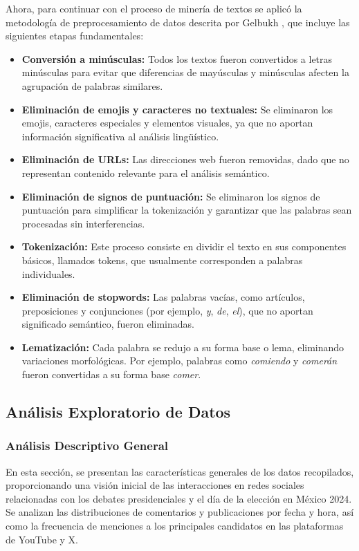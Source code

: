 \documentclass[10pt, a4paper]{article}
\begin{document}
	Ahora, para continuar con el proceso de minería de textos se aplicó la metodología de preprocesamiento de datos descrita por Gelbukh \parencite{gelbukh2003procesamiento}, que incluye las siguientes etapas fundamentales:
	
	\begin{itemize}
		\item \textbf{Conversión a minúsculas:} Todos los textos fueron convertidos a letras minúsculas para evitar que diferencias de mayúsculas y minúsculas afecten la agrupación de palabras similares.
		
		\item \textbf{Eliminación de emojis y caracteres no textuales:} Se eliminaron los emojis, caracteres especiales y elementos visuales, ya que no aportan información significativa al análisis lingüístico.
		
		\item \textbf{Eliminación de URLs:} Las direcciones web fueron removidas, dado que no representan contenido relevante para el análisis semántico.
		
		\item \textbf{Eliminación de signos de puntuación:} Se eliminaron los signos de puntuación para simplificar la tokenización y garantizar que las palabras sean procesadas sin interferencias.
		
		\item \textbf{Tokenización:} Este proceso consiste en dividir el texto en sus componentes básicos, llamados tokens, que usualmente corresponden a palabras individuales.
		
		\item \textbf{Eliminación de stopwords:} Las palabras vacías, como artículos, preposiciones y conjunciones (por ejemplo, \textit{y}, \textit{de}, \textit{el}), que no aportan significado semántico, fueron eliminadas.
		
		\item \textbf{Lematización:} Cada palabra se redujo a su forma base o lema, eliminando variaciones morfológicas. Por ejemplo, palabras como \textit{comiendo} y \textit{comerán} fueron convertidas a su forma base \textit{comer}.
	\end{itemize}
	
	\subsection{Análisis Exploratorio de Datos}
	
	\subsubsection{Análisis Descriptivo General}
	En esta sección, se presentan las características generales de los datos recopilados, proporcionando una visión inicial de las interacciones en redes sociales relacionadas con los debates presidenciales y el día de la elección en México 2024. Se analizan las distribuciones de comentarios y publicaciones por fecha y hora, así como la frecuencia de menciones a los principales candidatos en las plataformas de YouTube y X.
	
\end{document}
